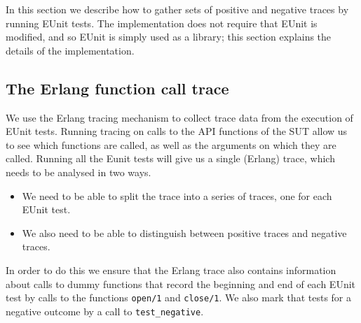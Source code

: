 \documentclass[]{sigplanconf}
\begin{document}
In this section we describe how to gather sets of positive and negative traces by running EUnit tests. The implementation does not require that EUnit is modified, and so EUnit is simply used as a library; this section explains the details of the implementation.

\subsection{The Erlang function call trace}
\label{function-traces} 

We use the Erlang tracing mechanism to collect trace data from the execution of EUnit tests. Running tracing on calls to the API functions of the SUT allow us to see which functions are called, as well as the arguments on which they are called. Running all the Eunit tests will give us a single (Erlang) trace, which needs to be analysed in two ways.
\begin{itemize}
\item
We need to be able to split the trace into a series of traces, one for each EUnit test.
\item
We also need to be able to distinguish between positive traces and negative traces. 
\end{itemize}
In order to do this we ensure that the Erlang trace also contains information about calls to dummy functions that record the beginning and end of each EUnit test by calls to the functions \texttt{open/1} and \texttt{close/1}. We also mark that tests for a negative outcome by a call to \texttt{test\_negative}.
\end{document}
